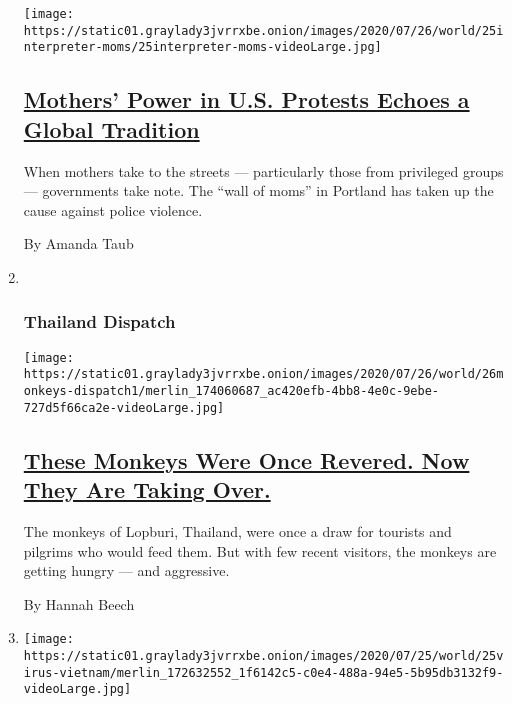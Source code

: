 \begin{enumerate}
  \texttt{[image: https://static01.graylady3jvrrxbe.onion/images/2020/07/26/world/25interpreter-moms/25interpreter-moms-videoLarge.jpg]}

  \hypertarget{mothers-power-in-us-protests-echoes-a-global-tradition}{%
  \subsection{\texorpdfstring{\href{/2020/07/25/world/americas/protest-moms-power-police.html}{Mothers'
  Power in U.S. Protests Echoes a Global
  Tradition}}{Mothers' Power in U.S. Protests Echoes a Global Tradition}}\label{mothers-power-in-us-protests-echoes-a-global-tradition}}

  When mothers take to the streets --- particularly those from
  privileged groups --- governments take note. The ``wall of moms'' in
  Portland has taken up the cause against police violence.

  By Amanda Taub
\item ~
  \hypertarget{thailand-dispatch}{%
  \subsubsection{Thailand Dispatch}\label{thailand-dispatch}}

  \texttt{[image: https://static01.graylady3jvrrxbe.onion/images/2020/07/26/world/26monkeys-dispatch1/merlin\_174060687\_ac420efb-4bb8-4e0c-9ebe-727d5f66ca2e-videoLarge.jpg]}

  \hypertarget{these-monkeys-were-once-revered-now-they-are-taking-over}{%
  \subsection{\texorpdfstring{\href{/2020/07/25/world/asia/thailand-monkeys.html}{These
  Monkeys Were Once Revered. Now They Are Taking
  Over.}}{These Monkeys Were Once Revered. Now They Are Taking Over.}}\label{these-monkeys-were-once-revered-now-they-are-taking-over}}

  The monkeys of Lopburi, Thailand, were once a draw for tourists and
  pilgrims who would feed them. But with few recent visitors, the
  monkeys are getting hungry --- and aggressive.

  By Hannah Beech
\item
  \texttt{[image: https://static01.graylady3jvrrxbe.onion/images/2020/07/25/world/25virus-vietnam/merlin\_172632552\_1f6142c5-c0e4-488a-94e5-5b95db3132f9-videoLarge.jpg]}

  \hypertarget{vietnam-lauded-in-coronavirus-fight-has-first-local-case-in-100-days}{%
}
\end{enumerate}
